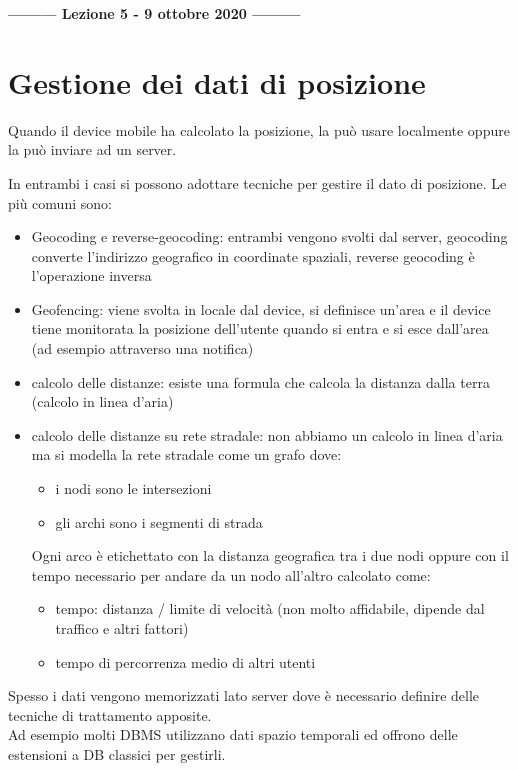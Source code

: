 \begin{center}
    \textbf{--------- Lezione 5 - 9 ottobre 2020 ---------}
\end{center}

\section{Gestione dei dati di posizione}
Quando il device mobile ha calcolato la posizione, la può usare localmente oppure la può inviare ad un server.

In entrambi i casi si possono adottare tecniche per gestire il dato di posizione. 
Le più comuni sono:
\begin{itemize}
    \item Geocoding e reverse-geocoding: entrambi vengono svolti dal server, geocoding converte l'indirizzo geografico in coordinate spaziali, reverse geocoding è l'operazione inversa
    \item Geofencing: viene svolta in locale dal device, si definisce un'area e il device tiene monitorata la posizione dell'utente quando si entra e si esce dall'area (ad esempio attraverso una notifica)
    \item calcolo delle distanze: esiste una formula che calcola la distanza dalla terra (calcolo in linea d'aria)
    \item calcolo delle distanze su rete stradale: non abbiamo un calcolo in linea d'aria ma si modella la rete stradale come un grafo dove:
    \begin{itemize}
        \item i nodi sono le intersezioni
        \item gli archi sono i segmenti di strada
    \end{itemize}
    Ogni arco è etichettato con la distanza geografica tra i due nodi oppure con il tempo necessario per andare da un nodo all'altro calcolato come:
    \begin{itemize}
        \item tempo: distanza / limite di velocità (non molto affidabile, dipende dal traffico e altri fattori) 
        \item tempo di percorrenza medio di altri utenti
    \end{itemize}
\end{itemize}

Spesso i dati vengono memorizzati lato server dove è necessario definire delle tecniche di trattamento apposite.
\\ Ad esempio molti DBMS utilizzano dati spazio temporali ed offrono delle estensioni a DB classici per gestirli. 

